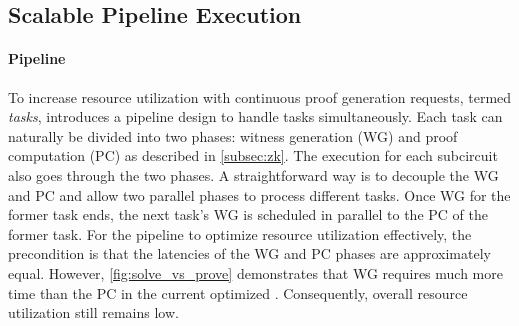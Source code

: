 






\subsection{Scalable Pipeline Execution}


\paragraph{Pipeline} 
To increase resource utilization with continuous proof generation requests, termed \emph{tasks}, \system introduces a pipeline design to handle tasks simultaneously. Each task can naturally be divided into two phases: witness generation (WG) and proof computation (PC) as described in \cref{subsec:zk}.  The execution for each subcircuit also goes through the two phases. A straightforward way is to decouple the WG and PC and allow two parallel phases to process different tasks. Once WG for the former task ends, the next task's WG is scheduled in parallel to the PC of the former task. 
For the pipeline to optimize resource utilization effectively, the precondition is that the latencies of the WG and PC phases are approximately equal. However, \cref{fig:solve_vs_prove} demonstrates that WG requires much more time than the PC in the current optimized {\zk}. Consequently, overall resource utilization still remains low. 

